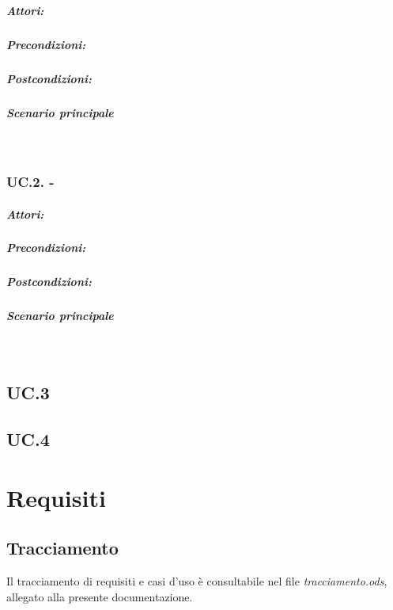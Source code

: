 \documentclass[10pt,a4paper,headinclude,footinclude,hidelinks]{scrreprt} %
\begin{document}
	\paragraph{Attori:}
	\paragraph{Precondizioni:}
	\paragraph{Postcondizioni:}
	\paragraph{Scenario principale} \hfill \\

	\subsection[UC.2.]{UC.2. - }
	\label{ch:stage:ar:uc:2_}
	\paragraph{Attori:}
	\paragraph{Precondizioni:}
	\paragraph{Postcondizioni:}
	\paragraph{Scenario principale} \hfill \\


	\section{UC.3}
	\section{UC.4}

	\chapter{Requisiti}
	\label{ch:stage:ar:requisiti}

	\section{Tracciamento}
	\label{ch:stage:ar:requisiti:matrice}

	Il tracciamento di requisiti e casi d'uso è consultabile nel file \textit{tracciamento.ods}, allegato alla presente documentazione.
\end{document}
